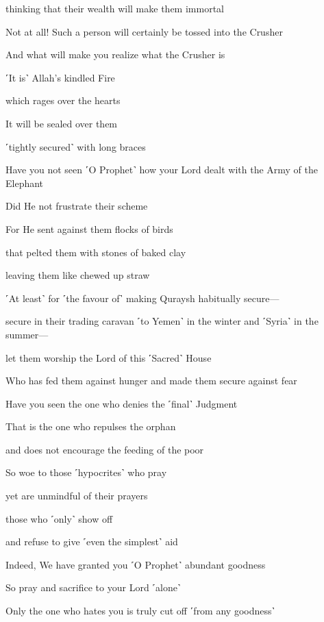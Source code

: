 thinking that their wealth will make them immortal

Not at all! Such a person will certainly be tossed into the Crusher

And what will make you realize what the Crusher is

˹It is˺ Allah’s kindled Fire

which rages over the hearts

It will be sealed over them

˹tightly secured˺ with long braces

Have you not seen ˹O Prophet˺ how your Lord dealt with the Army of the Elephant

Did He not frustrate their scheme

For He sent against them flocks of birds

that pelted them with stones of baked clay

leaving them like chewed up straw

˹At least˺ for ˹the favour of˺ making Quraysh habitually secure—

secure in their trading caravan ˹to Yemen˺ in the winter and ˹Syria˺ in the summer—

let them worship the Lord of this ˹Sacred˺ House

Who has fed them against hunger and made them secure against fear

Have you seen the one who denies the ˹final˺ Judgment

That is the one who repulses the orphan

and does not encourage the feeding of the poor

So woe to those ˹hypocrites˺ who pray

yet are unmindful of their prayers

those who ˹only˺ show off

and refuse to give ˹even the simplest˺ aid

Indeed, We have granted you ˹O Prophet˺ abundant goodness

So pray and sacrifice to your Lord ˹alone˺

Only the one who hates you is truly cut off ˹from any goodness˺

